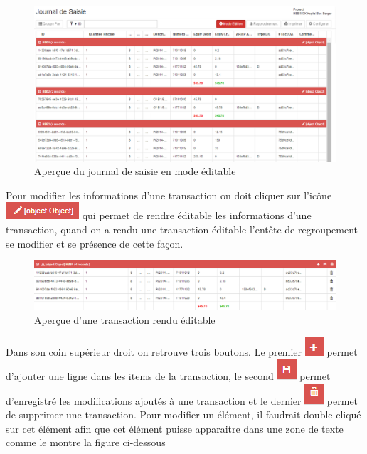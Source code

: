 \documentclass[12pt,a4paper]{report}
\begin{document}
\begin{figure}[h]
\begin{center}
\includegraphics[width=14cm]{pic/ModeEditionJournal.png}
\end{center}
\caption{Aperçue du journal de saisie en mode éditable}
\label{Aperçue du journal de saisie en mode éditable}
\end{figure}
\newpage
Pour modifier les informations d'une transaction on doit cliquer sur l'icône 
\includegraphics[scale=0.7]{pic/ErrorBouton.png} qui permet de rendre éditable les informations d'une transaction, quand on a rendu une transaction éditable l'entête de regroupement se modifier et se présence de cette façon.

\begin{figure}[h]
\begin{center}
\includegraphics[width=14cm]{pic/InterfaceEditable.png}
\end{center}
\caption{Aperçue d'une transaction rendu éditable}
\label{Aperçue d'une transaction rendu éditable}
\end{figure}

Dans son coin supérieur droit on retrouve trois boutons. Le premier \includegraphics[scale=0.7]{pic/PlusRed.png}  permet d'ajouter une ligne dans les items de la transaction, le second \includegraphics[scale=0.7]{pic/SaveRed.png}  permet d'enregistré les modifications ajoutés à une transaction et le dernier \includegraphics[scale=0.7]{pic/RecycleRed.png}  permet de supprimer une transaction. 
Pour modifier un élément, il faudrait double cliqué sur cet élément afin que cet élément puisse apparaitre dans une zone de texte comme le montre la figure ci-dessous
\end{document}
